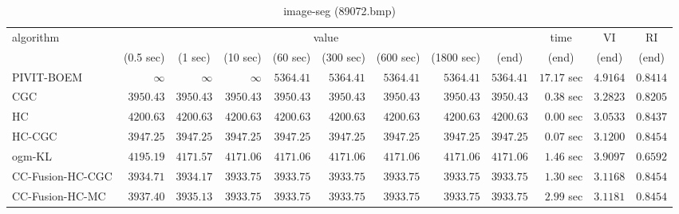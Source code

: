 \begin{table}[H]
\scriptsize
\centering
\caption{image-seg (89072.bmp)}
\label{tab:anytimetable-image-seg-89072.bmp}
\begin{tabular}{lrrrrrrrrrrr}
\toprule
           algorithm &                                   \multicolumn{8}{c}{value} & \multicolumn{1}{c}{time}    & \multicolumn{1}{c}{VI}  & \multicolumn{1}{c}{RI} \\  
\cmidrule(lr){2-9}\cmidrule(lr){10-10} \cmidrule(lr){11-11} \cmidrule(lr){12-12}   
                     & \multicolumn{1}{c}{(0.5 sec)} & \multicolumn{1}{c}{(1 sec)} & \multicolumn{1}{c}{(10 sec)} & \multicolumn{1}{c}{(60 sec)} & \multicolumn{1}{c}{(300 sec)} & \multicolumn{1}{c}{(600 sec)} & \multicolumn{1}{c}{(1800 sec)} & \multicolumn{1}{c}{(end)} & \multicolumn{1}{c}{(end)}    & \multicolumn{1}{c}{(end)}   & \multicolumn{1}{c}{(end)}  \\ \midrule 
          PIVIT-BOEM & $\infty$ & $\infty$ & $\infty$ & $      5364.41$ & $      5364.41$ & $      5364.41$ & $      5364.41$ & $      5364.41$ & $        17.17$ sec    & $       4.9164$  & $       0.8414$ \\ 
                 CGC & $      3950.43$ & $      3950.43$ & $      3950.43$ & $      3950.43$ & $      3950.43$ & $      3950.43$ & $      3950.43$ & $      3950.43$ & $         0.38$ sec    & $       3.2823$  & $       0.8205$ \\ 
                  HC & $      4200.63$ & $      4200.63$ & $      4200.63$ & $      4200.63$ & $      4200.63$ & $      4200.63$ & $      4200.63$ & $      4200.63$ & $         0.00$ sec    & $       3.0533$  & $       0.8437$ \\ 
              HC-CGC & $      3947.25$ & $      3947.25$ & $      3947.25$ & $      3947.25$ & $      3947.25$ & $      3947.25$ & $      3947.25$ & $      3947.25$ & $         0.07$ sec    & $       3.1200$  & $       0.8454$ \\ 
              ogm-KL & $      4195.19$ & $      4171.57$ & $      4171.06$ & $      4171.06$ & $      4171.06$ & $      4171.06$ & $      4171.06$ & $      4171.06$ & $         1.46$ sec    & $       3.9097$  & $       0.6592$ \\ 
    CC-Fusion-HC-CGC & $      3934.71$ & $      3934.17$ & $      3933.75$ & $      3933.75$ & $      3933.75$ & $      3933.75$ & $      3933.75$ & $      3933.75$ & $         1.30$ sec    & $       3.1168$  & $       0.8454$ \\ 
     CC-Fusion-HC-MC & $      3937.40$ & $      3935.13$ & $      3933.75$ & $      3933.75$ & $      3933.75$ & $      3933.75$ & $      3933.75$ & $      3933.75$ & $         2.99$ sec    & $       3.1181$  & $       0.8454$ \\ 

\end{tabular}
\end{table}
